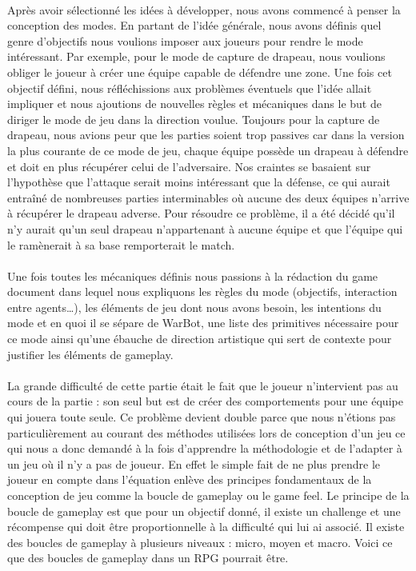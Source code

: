 \documentclass{report}
\begin{document}
 \paragraph{}
 \newpage
  Après avoir sélectionné les idées à développer, nous avons commencé à penser la conception des modes. En partant de l’idée générale, nous avons définis quel genre d’objectifs nous voulions imposer aux joueurs pour rendre le mode intéressant. Par exemple, pour le mode de capture de drapeau, nous voulions obliger le joueur à créer une équipe capable de défendre une zone. \newline
Une fois cet objectif défini, nous réfléchissions aux problèmes éventuels que l’idée allait impliquer et nous ajoutions de nouvelles règles et mécaniques dans le but de diriger le mode de jeu dans la direction voulue. Toujours pour la capture de drapeau, nous avions peur que les parties soient trop passives car dans la version la plus courante de ce mode de jeu, chaque équipe possède un drapeau à défendre et doit en plus récupérer celui de l’adversaire. Nos craintes se basaient sur l'hypothèse que l’attaque serait moins intéressant que la défense, ce qui aurait entraîné de nombreuses parties interminables où aucune des deux équipes n’arrive à récupérer le drapeau adverse. Pour résoudre ce problème, il a été décidé qu’il n’y aurait qu’un seul drapeau n’appartenant à aucune équipe et que l’équipe qui le ramènerait à sa base remporterait le match.
\paragraph{}

  Une fois toutes les mécaniques définis nous passions à la rédaction du game document dans lequel nous expliquons les règles du mode (objectifs, interaction entre agents…), les éléments de jeu dont nous avons besoin, les intentions du mode et en quoi il se sépare de WarBot, une liste des primitives nécessaire pour ce mode ainsi qu’une ébauche de direction artistique qui sert de contexte pour justifier les éléments de gameplay.
\paragraph{}

  La grande difficulté de cette partie était le fait que le joueur n’intervient pas au cours de la partie : son seul but est de créer des comportements pour une équipe qui jouera toute seule. Ce problème devient double parce que nous n’étions pas particulièrement au courant des méthodes utilisées lors de conception d'un jeu ce qui nous a donc demandé à la fois d’apprendre la méthodologie et de l’adapter à un jeu où il n’y a pas de joueur. \newline
En effet le simple fait de ne plus prendre le joueur en compte dans l’équation enlève des principes fondamentaux de la conception de jeu comme la boucle de gameplay ou le game feel. 
Le principe de la boucle de gameplay est que  pour un objectif donné, il existe un challenge et une récompense qui doit être proportionnelle à la difficulté qui lui ai associé. Il existe des boucles de gameplay à plusieurs niveaux : micro, moyen et macro. Voici ce que des boucles de gameplay dans un RPG pourrait être.
\end{document}
